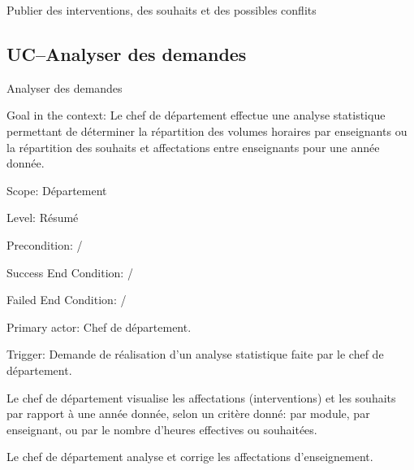 \begin{ocl}
\begin{usecase}{Publier des interventions, des souhaits et des possibles conflits}
\end{usecase}

 \subsection{UC\---Analyser des demandes}

\begin{usecase}{Analyser des demandes}\label{usecase:analyse}

\begin{information}
	

\item[Goal in the context:] Le chef de département effectue une analyse statistique permettant de déterminer la répartition des volumes horaires par enseignants ou la répartition des souhaits et affectations entre enseignants pour une année donnée. 

\item[Scope:] Département

\item[{Level:}] Résumé

\item[{Precondition:}]
 /

 \item[Success End Condition:]
/

 \item[Failed End Condition:]
 /

 \item[Primary actor:]
 Chef de département.

 \item[Trigger:]
 Demande de réalisation d'un analyse statistique faite par le chef de département.\\
\end{information}

\begin{scenario}
	\item Le chef de département visualise les affectations (interventions) et les souhaits par rapport à une année donnée, selon un critère donné: par module, par enseignant, ou par le nombre d'heures effectives ou souhaitées.
	\item Le chef de département analyse et corrige les affectations d'enseignement.
\end{scenario}


\end{usecase}
\end{ocl}
